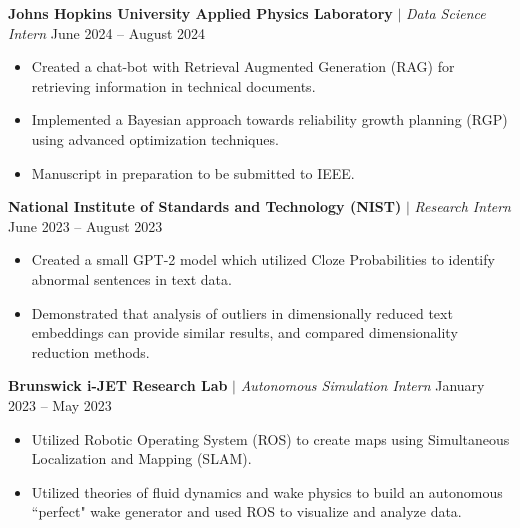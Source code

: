 \documentclass[letterpaper,10pt]{article}
\begin{document}
\textbf{Johns Hopkins University Applied Physics Laboratory} $|$ \textit{Data Science Intern} \hfill June 2024 -- August 2024\vspace{-5pt}
\begin{itemize}[itemsep=-5pt, parsep=5pt, leftmargin=0.25in]
    \item Created a chat-bot with Retrieval Augmented Generation (RAG) for retrieving information in technical documents.
    \item Implemented a Bayesian approach towards reliability growth planning (RGP) using advanced optimization techniques.
    \item Manuscript in preparation to be submitted to IEEE.
\end{itemize}

\textbf{National Institute of Standards and Technology (NIST)} $|$ \textit{Research Intern} \hfill June 2023 -- August 2023\vspace{-5pt}
\begin{itemize}[itemsep=-5pt, parsep=5pt, leftmargin=0.25in]
    \item Created a small GPT-2 model which utilized Cloze Probabilities to identify abnormal sentences in text data.
    \item Demonstrated that analysis of outliers in dimensionally reduced text embeddings can provide similar results, and compared dimensionality reduction methods.
\end{itemize}

\textbf{Brunswick i-JET Research Lab} $|$ \textit{Autonomous Simulation Intern} \hfill January 2023 -- May 2023\vspace{-5pt}
\begin{itemize}[itemsep=-5pt, parsep=5pt, leftmargin=0.25in]
    \item Utilized Robotic Operating System (ROS) to create maps using Simultaneous Localization and Mapping (SLAM).
    \item Utilized theories of fluid dynamics and wake physics to build an autonomous ``perfect" wake generator and used ROS to visualize and analyze data.
\end{itemize}

    
\end{document}
